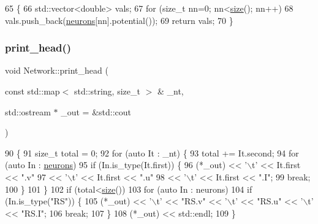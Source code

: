 \begin{DoxyCode}
65                                             \{
66     std::vector<double> vals;
67     \textcolor{keywordflow}{for} (\textcolor{keywordtype}{size\_t} nn=0; nn<\hyperlink{classNetwork_a41c54d12d861883170b5c5abca3a7bc8}{size}(); nn++)
68         vals.push\_back(\hyperlink{classNetwork_a1b7832bc2c7b8855cdc3b2d6329eff9d}{neurons}[nn].potential());
69     \textcolor{keywordflow}{return} vals;
70 \}
\end{DoxyCode}
\mbox{\label{classNetwork_ab572dd33cb91d9f0aae89c4477809d26}} 
\subsubsection{\texorpdfstring{print\+\_\+head()}{print\_head()}}
{\footnotesize\ttfamily void Network\+::print\+\_\+head (\begin{DoxyParamCaption}\item[{const std\+::map$<$ std\+::string, size\+\_\+t $>$ \&}]{\+\_\+nt,  }\item[{std\+::ostream $\ast$}]{\+\_\+out = {\ttfamily \&std\+:\+:cout} }\end{DoxyParamCaption})}


\begin{DoxyCode}
90                                            \{
91     \textcolor{keywordtype}{size\_t} total = 0;
92     \textcolor{keywordflow}{for} (\textcolor{keyword}{auto} It : \_nt) \{
93         total += It.second;
94         \textcolor{keywordflow}{for} (\textcolor{keyword}{auto} In : \hyperlink{classNetwork_a1b7832bc2c7b8855cdc3b2d6329eff9d}{neurons})
95             \textcolor{keywordflow}{if} (In.is\_type(It.first)) \{
96                 (*\_out) << \textcolor{charliteral}{'\(\backslash\)t'} << It.first << \textcolor{stringliteral}{".v"}
97                         << \textcolor{charliteral}{'\(\backslash\)t'} << It.first << \textcolor{stringliteral}{".u"}
98                         << \textcolor{charliteral}{'\(\backslash\)t'} << It.first << \textcolor{stringliteral}{".I"};
99                 \textcolor{keywordflow}{break};
100             \}
101     \}
102     \textcolor{keywordflow}{if} (total<\hyperlink{classNetwork_a41c54d12d861883170b5c5abca3a7bc8}{size}())
103         \textcolor{keywordflow}{for} (\textcolor{keyword}{auto} In : neurons) 
104             \textcolor{keywordflow}{if} (In.is\_type(\textcolor{stringliteral}{"RS"})) \{
105                 (*\_out) << \textcolor{charliteral}{'\(\backslash\)t'} << \textcolor{stringliteral}{"RS.v"} << \textcolor{charliteral}{'\(\backslash\)t'} << \textcolor{stringliteral}{"RS.u"} << \textcolor{charliteral}{'\(\backslash\)t'} << \textcolor{stringliteral}{"RS.I"};
106                 \textcolor{keywordflow}{break};
107             \}
108     (*\_out) << std::endl;
109 \}
\end{DoxyCode}
\mbox{\label{classNetwork_afc43116eb2429aeec0f3c6a54d252142}} 
